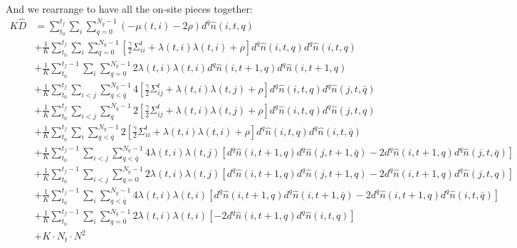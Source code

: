 \documentclass[12pt]{article}
\begin{document}
And we rearrange to have all the on-site pieces together:
\begin{align}
K\hat{D} &= \sum_{t_0}^{t_f} \sum_i \sum_{q=0}^{N_q-1} (-\mu(t,i) - 2\rho) d^q \hat{n}(i,t,q) \nonumber\\
&+ \frac{1}{K} \sum_{t_0}^{t_f} \sum_{i} \sum_{q=0}^{N_q-1} \left[ \frac{\gamma}{2} {\Sigma^t_{ii}} + \lambda(t,i)\lambda(t,i) + \rho \right] d^q \hat{n}(i,t,q) d^q \hat{n}(i,t,{q}) \nonumber\\
&+ \frac{1}{K} \sum_{t_0}^{t_f-1} \sum_{i} \sum_{q=0}^{N_q-1} 2\lambda(t,i)\lambda(t,i) d^q \hat{n}(i,t+1,q) d^q \hat{n}(i,t+1,{q}) \nonumber\\ 
&+ \frac{1}{K} \sum_{t_0}^{t_f} \sum_{i<j} \sum_{q<\bar{q}}^{N_q-1} 4\left[ \frac{\gamma}{2} {\Sigma^t_{ij}} + \lambda(t,i)\lambda(t,j) + \rho \right] d^q \hat{n}(i,t,q) d^q \hat{n}(j,t,\bar{q}) \nonumber\\
&+ \frac{1}{K} \sum_{t_0}^{t_f} \sum_{i<j} \sum_{q}^{N_q-1} 2\left[ \frac{\gamma}{2} {\Sigma^t_{ij}} + \lambda(t,i)\lambda(t,j) + \rho \right] d^q \hat{n}(i,t,q) d^q \hat{n}(j,t,q) \nonumber\\
&+ \frac{1}{K} \sum_{t_0}^{t_f} \sum_{i} \sum_{q<\bar{q}}^{N_q-1} 2\left[ \frac{\gamma}{2} {\Sigma^t_{ii}} + \lambda(t,i)\lambda(t,i) + \rho \right] d^q \hat{n}(i,t,q) d^q \hat{n}(i,t,\bar{q}) \nonumber\\
&+ \frac{1}{K} \sum_{t_0}^{t_f-1} \sum_{i<j} \sum_{q<\bar{q}}^{N_q-1} 4\lambda(t,i)\lambda(t,j) \left[ d^q \hat{n}(i,t+1,q) d^q \hat{n}(j,t+1,\bar{q}) - 2 d^q \hat{n}(i,t+1,q) d^q \hat{n}(j,t,\bar{q}) \right] \nonumber\\    
&+ \frac{1}{K} \sum_{t_0}^{t_f-1} \sum_{i<j} \sum_{q=0}^{N_q-1} 2\lambda(t,i)\lambda(t,j) \left[ d^q \hat{n}(i,t+1,q) d^q \hat{n}(j,t+1,{q}) - 2 d^q \hat{n}(i,t+1,q) d^q \hat{n}(j,t,{q}) \right] \nonumber\\    
&+ \frac{1}{K} \sum_{t_0}^{t_f-1} \sum_{i} \sum_{q<\bar{q}}^{N_q-1}4\lambda(t,i)\lambda(t,i) \left[ d^q \hat{n}(i,t+1,q) d^q \hat{n}(i,t+1,\bar{q}) - 2 d^q \hat{n}(i,t+1,q) d^q \hat{n}(i,t,\bar{q}) \right] \nonumber\\    
&+ \frac{1}{K} \sum_{t_0}^{t_f-1} \sum_{i} \sum_{q=0}^{N_q-1} 2\lambda(t,i)\lambda(t,i) \left[ - 2 d^q \hat{n}(i,t+1,q) d^q \hat{n}(i,t,{q}) \right] \nonumber\\ 
&+ K\cdot N_t\cdot N^2 
\end{align}


\begin{thebibliography}{10}
\end{thebibliography}
\end{document}
